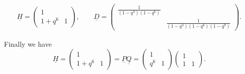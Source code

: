 \documentclass[12pt]{amsart}
\renewcommand{\1}{\mathbb 1}
\newcommand\ul{\underline}
\numberwithin{equation}{section}
\begin{document}
{\footnotesize
\begin{align*}
\tag{7.7.2}  
\ul H = \begin{pmatrix}
           1  &   \\
           1 + q^6  &    1
        \end{pmatrix},   \qquad
\ul D = \begin{pmatrix}
            \frac{1}{(1-q^3)(1-q^6)}  &   \\
                   &   \frac{1}{(1-q^3)(1-q^6)(1-q^9)}
        \end{pmatrix}.
\end{align*}  
}

Finally we have
{\footnotesize
\begin{equation*}
\tag{7.7.3}  
\ul H = \begin{pmatrix}
          1  &     \\    
          1 + q^6  &  1 
         \end{pmatrix}
      =  \ul P \ul Q  = \begin{pmatrix}
                            1   &   \\
                            q^6  &   1
                       \end{pmatrix}     
                       \begin{pmatrix}
                          1   &    \\
                          1   &   1 
                       \end{pmatrix}.
\end{equation*}  
}
\end{document}
